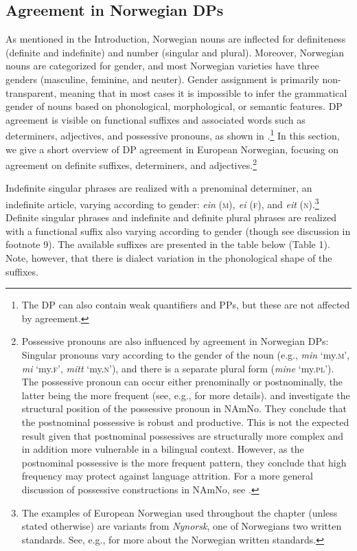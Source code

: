 \documentclass[output=paper]{langscibook}
\begin{document}
\subsection{Agreement in Norwegian DPs}\label{sec:riksem:2.1}
As mentioned in the Introduction, Norwegian nouns are inflected for definiteness (definite and indefinite) and number (singular and plural). Moreover, Norwegian nouns are categorized for gender, and most Norwegian varieties have three genders (masculine, feminine, and neuter). Gender assignment is primarily non-transparent, meaning that in most cases it is impossible to infer the grammatical gender of nouns based on phonological, morphological, or semantic features. DP agreement is visible on functional suffixes and associated words such as determiners, adjectives, and possessive pronouns, as shown in .\footnote{ \textrm{The DP can also contain weak quantifiers and PPs, but these are not affected by agreement.}} In this section, we give a short overview of DP agreement in European Norwegian, focusing on agreement on definite suffixes, determiners, and adjectives.\footnote{\textrm{Possessive pronouns are also influenced by agreement in Norwegian DPs: Singular pronouns vary according to the gender of the noun (e.g.,} \textrm{\textit{min} }\textrm{‘my.}\textrm{\textsc{m}}\textrm{’,} \textrm{\textit{mi}} \textrm{‘my.}\textrm{\textsc{f}}\textrm{’,} \textrm{\textit{mitt} }\textrm{‘my.}\textrm{\textsc{n}}\textrm{’), and there is a separate plural form (}\textrm{\textit{mine}} \textrm{‘my.}\textrm{\textsc{pl}}\textrm{’). The possessive pronoun can occur either prenominally or postnominally, the latter being the more frequent (see, e.g., \citealt{WestergaardAnderssen2015, AnderssenEtAl2018} for more details). \citet{WestergaardAnderssen2015} and \citet{AnderssenEtAl2018} investigate the structural position of the possessive pronoun in NAmNo. They conclude that the postnominal possessive is robust and productive. This is not the expected result given that postnominal possessives are structurally more complex and in addition more vulnerable in a bilingual context. However, as the postnominal possessive is the more frequent pattern, they conclude that high frequency may protect against language attrition. For a more general discussion of possessive constructions in NAmNo, see .}}


Indefinite singular phrases are realized with a prenominal determiner, an indefinite article, varying according to gender: \textit{ein} (\textsc{m})\textit{, ei} (\textsc{f}), and \textit{eit} (\textsc{n}).\footnote{ \textrm{The examples of European Norwegian used throughout the chapter (unless stated otherwise) are variants from} \textrm{\textit{Nynorsk}}\textrm{, one of Norwegians two written standards. See, e.g., \citet{Vikør2001} for more about the Norwegian written standards.} } Definite singular phrases and indefinite and definite plural phrases are realized with a functional suffix also varying according to gender (though see discussion in footnote 9). The available suffixes are presented in the table below (Table 1). Note, however, that there is dialect variation in the phonological shape of the suffixes. 
\end{document}
